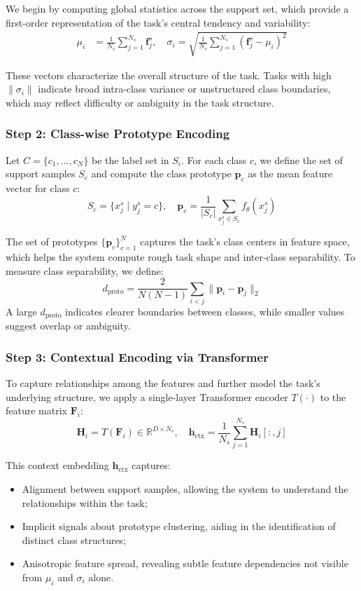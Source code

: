 \documentclass[conference]{IEEEtran}
\begin{document}
We begin by computing global statistics across the support set, which provide a first-order representation of the task’s central tendency and variability:
\begin{align}
    \mu_i &= \frac{1}{N_s} \sum_{j=1}^{N_s} \mathbf{f}_j^s, \quad 
    \sigma_i = \sqrt{\frac{1}{N_s} \sum_{j=1}^{N_s} (\mathbf{f}_j^s - \mu_i)^2}
\end{align}

These vectors characterize the overall structure of the task. Tasks with high $\|\sigma_i\|$ indicate broad intra-class variance or unstructured class boundaries, which may reflect difficulty or ambiguity in the task structure.

\subsubsection*{Step 2: Class-wise Prototype Encoding}

Let $C = \{c_1, \ldots, c_N\}$ be the label set in $S_i$. For each class $c$, we define the set of support samples $S_c$ and compute the class prototype $\mathbf{p}_c$ as the mean feature vector for class $c$:
\[
S_c = \{x_j^s \mid y_j^s = c\}, \quad \mathbf{p}_c = \frac{1}{|S_c|} \sum_{x_j^s \in S_c} f_\theta(x_j^s)
\]

The set of prototypes $\{\mathbf{p}_c\}_{c=1}^N$ captures the task’s class centers in feature space, which helps the system compute rough task shape and inter-class separability. To measure class separability, we define:
\[
d_{\text{proto}} = \frac{2}{N(N-1)} \sum_{i<j} \|\mathbf{p}_i - \mathbf{p}_j\|_2
\]
A large $d_{\text{proto}}$ indicates clearer boundaries between classes, while smaller values suggest overlap or ambiguity.

\subsubsection*{Step 3: Contextual Encoding via Transformer}

To capture relationships among the features and further model the task’s underlying structure, we apply a single-layer Transformer encoder $T(\cdot)$ to the feature matrix $\mathbf{F}_i$:
\[
\mathbf{H}_i = T(\mathbf{F}_i) \in \mathbb{R}^{D \times N_s}, \quad 
\mathbf{h}_{\text{ctx}} = \frac{1}{N_s} \sum_{j=1}^{N_s} \mathbf{H}_i[:,j]
\]

This context embedding $\mathbf{h}_{\text{ctx}}$ captures:
\begin{itemize}
    \item Alignment between support samples, allowing the system to understand the relationships within the task;
    \item Implicit signals about prototype clustering, aiding in the identification of distinct class structures;
    \item Anisotropic feature spread, revealing subtle feature dependencies not visible from $\mu_i$ and $\sigma_i$ alone.
\end{itemize}
\end{document}
